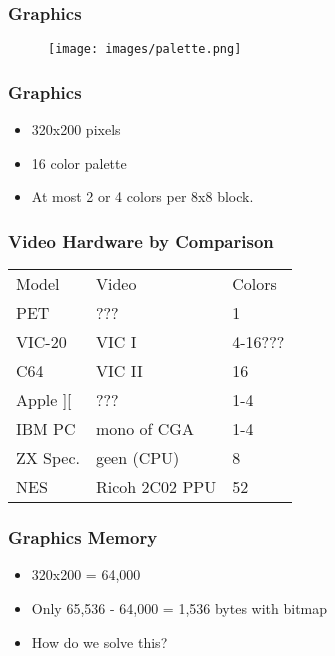 \begin{frame}
\frametitle{Graphics}

\begin{figure}
\texttt{[image: images/palette.png]}
\end{figure}

\end{frame}


\begin{frame}
\frametitle{Graphics}

\begin{itemize}
\item 320x200 pixels
\item 16 color palette
\item At most 2 or 4 colors per 8x8 block.
\end{itemize}

\end{frame}


\begin{frame}
\frametitle{Video Hardware by Comparison}

\begin{tabular}{|l|l|l|}
\hline Model & Video & Colors \\
PET & ??? & 1 \\
VIC-20 & VIC I & 4-16??? \\
C64 & VIC II & 16 \\
Apple ][ & ??? & 1-4 \\
IBM PC & mono of CGA & 1-4 \\
ZX Spec. & geen (CPU) & 8 \\ \hline
NES & Ricoh 2C02 PPU & 52 \\ \hline
\end{tabular}

\end{frame}


\begin{frame}
\frametitle{Graphics Memory}

\begin{itemize}
\item 320x200 = 64,000
\item Only 65,536 - 64,000 = 1,536 bytes with bitmap
\item How do we solve this?
\end{itemize}

\end{frame}


